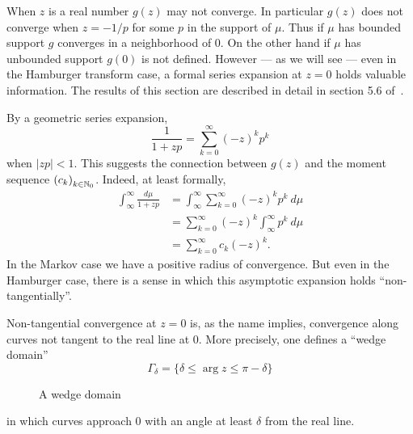 When $z$ is a real number $g(z)$ may not converge. In particular $g(z)$ does not converge when $z = -1/p$ for some $p$ in the support of $\mu$.  Thus if $\mu$ has bounded support $g$ converges in a neighborhood of $0$. On the other hand if $\mu$ has unbounded support $g(0)$ is not defined. However — as we will see — even in the Hamburger transform case, a formal series expansion at $z = 0$ holds valuable information. The results of this section are described in detail in section 5.6 of~\cite{Bake81}.

By a geometric series expansion,
\[
  \frac1{1 + zp} = \sum_{k = 0}^\infty {(-z)}^k p^k 
\]
when $|zp| < 1$. This suggests the connection between $g(z)$ and the moment sequence ${(c_k)}_{k \in \mathbb{N}_0}$. Indeed, at least formally,
\begin{align*}
  \int_\infty^\infty\frac{d\mu}{1+zp}
  &= \int_\infty^\infty \sum_{k = 0}^\infty {(-z)}^k p^k ~d\mu \\
  &= \sum_{k = 0}^\infty {(-z)}^k \int_\infty^\infty p^k ~d\mu \\
  &= \sum_{k = 0}^\infty c_k{(-z)}^k.
\end{align*}
In the Markov case we have a positive radius of convergence. But even in the Hamburger case, there is a sense in which this asymptotic expansion holds ``non-tangentially''.

Non-tangential convergence at $z = 0$ is, as the name implies, convergence along curves not tangent to the real line at $0$. More precisely, one defines a ``wedge domain''
\[
  \Gamma_\delta = \{\delta \leq \arg z \leq \pi - \delta\}
\]
\begin{figure}
  \centering
  \caption{A wedge domain}\label{fig:wedge}
\end{figure}
in which curves approach $0$ with an angle at least $\delta$ from the real line.

